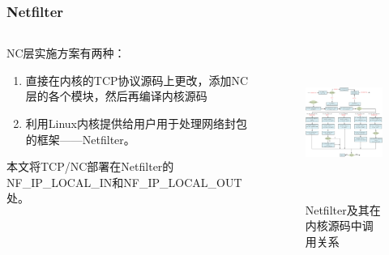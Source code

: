 \begin{frame}
	\frametitle{Netfilter}
	\begin{columns}
		\begin{column}{0.5\textwidth}
			NC层实施方案有两种：
			\begin{enumerate}
				\item 直接在内核的TCP协议源码上更改，添加NC层的各个模块，然后再编译内核源码
				\item 利用Linux内核提供给用户用于处理网络封包的框架——Netfilter。
			\end{enumerate}
			本文将TCP/NC部署在Netfilter的NF\_IP\_LOCAL\_IN和NF\_IP\_LOCAL\_OUT处。
		\end{column}
		\begin{column}{0.4\textwidth}
			\vspace{-1.5em}
			\begin{figure}
				\includegraphics[height=5cm]{../figures/packetflow.eps}
				\caption{Netfilter及其在内核源码中调用关系}
				\label{fig:packetflow}
			\end{figure}
		\end{column}
	\end{columns}

	\note{
	}
\end{frame}
